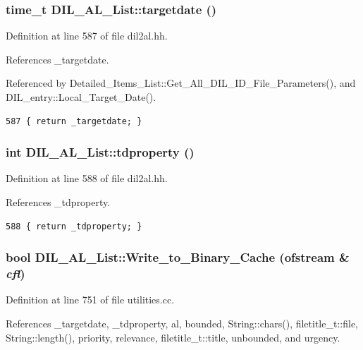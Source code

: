 \subsubsection{\setlength{\rightskip}{0pt plus 5cm}time\_\-t DIL\_\-AL\_\-List::targetdate ()\hspace{0.3cm}{\tt  [inline]}}\label{classDIL__AL__List_a5}




Definition at line 587 of file dil2al.hh.

References \_\-targetdate.

Referenced by Detailed\_\-Items\_\-List::Get\_\-All\_\-DIL\_\-ID\_\-File\_\-Parameters(), and DIL\_\-entry::Local\_\-Target\_\-Date().



\footnotesize\begin{verbatim}587 { return _targetdate; }
\end{verbatim}\normalsize 
{}
\subsubsection{\setlength{\rightskip}{0pt plus 5cm}int DIL\_\-AL\_\-List::tdproperty ()\hspace{0.3cm}{\tt  [inline]}}\label{classDIL__AL__List_a6}




Definition at line 588 of file dil2al.hh.

References \_\-tdproperty.



\footnotesize\begin{verbatim}588 { return _tdproperty; }
\end{verbatim}\normalsize 
{}
\subsubsection{\setlength{\rightskip}{0pt plus 5cm}bool DIL\_\-AL\_\-List::Write\_\-to\_\-Binary\_\-Cache (ofstream \& {\em cfl})}\label{classDIL__AL__List_a9}




Definition at line 751 of file utilities.cc.

References \_\-targetdate, \_\-tdproperty, al, bounded, String::chars(), filetitle\_\-t::file, String::length(), priority, relevance, filetitle\_\-t::title, unbounded, and urgency.



